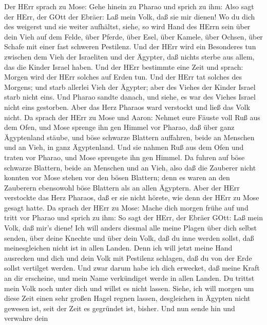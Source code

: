  Der HErr sprach zu Mose: Gehe hinein zu Pharao und sprich
zu ihm: Also sagt der HErr, der GOtt der Ebräer: Laß mein Volk, daß sie
mir dienen!  Wo du dich des weigerst und sie weiter
aufhältst,  siehe, so wird Hand des HErrn sein über dein
Vieh auf dem Felde, über Pferde, über Esel, über Kamele, über Ochsen,
über Schafe mit einer fast schweren Pestilenz.  Und der HErr
wird ein Besonderes tun zwischen dem Vieh der Israeliten und der
Ägypter, daß nichts sterbe aus allem, das die Kinder Israel haben.
 Und der HErr bestimmte eine Zeit und sprach: Morgen wird
der HErr solches auf Erden tun.  Und der HErr tat solches
des Morgens; und starb allerlei Vieh der Ägypter; aber des Viehes der
Kinder Israel starb nicht eins.  Und Pharao sandte danach,
und siehe, es war des Viehes Israel nicht eins gestorben. Aber das Herz
Pharaos ward verstockt und ließ das Volk nicht.  Da sprach
der HErr zu Mose und Aaron: Nehmet eure Fäuste voll Ruß aus dem Ofen,
und Mose sprenge ihn gen Himmel vor Pharao,  daß über ganz
Ägyptenland stäube, und böse schwarze Blattern auffahren, beide an
Menschen und an Vieh, in ganz Ägyptenland.  Und sie nahmen
Ruß aus dem Ofen und traten vor Pharao, und Mose sprengete ihn gen
Himmel. Da fuhren auf böse schwarze Blattern, beide an Menschen und an
Vieh,  also daß die Zauberer nicht konnten vor Mose stehen
vor den bösen Blattern; denn es waren an den Zauberern ebensowohl böse
Blattern als an allen Ägyptern.  Aber der HErr verstockte
das Herz Pharaos, daß er sie nicht hörete, wie denn der HErr zu Mose
gesagt hatte.  Da sprach der HErr zu Mose: Mache dich
morgen frühe auf und tritt vor Pharao und sprich zu ihm: So sagt der
HErr, der Ebräer GOtt: Laß mein Volk, daß mir's diene!  Ich
will anders diesmal alle meine Plagen über dich selbst senden, über
deine Knechte und über dein Volk, daß du inne werden sollst, daß
meinesgleichen nicht ist in allen Landen.  Denn ich will
jetzt meine Hand ausrecken und dich und dein Volk mit Pestilenz
schlagen, daß du von der Erde sollst vertilget werden.  Und
zwar darum habe ich dich erwecket, daß meine Kraft an dir erscheine, und
mein Name verkündiget werde in allen Landen.  Du trittst
mein Volk noch unter dich und willst es nicht lassen. 
Siehe, ich will morgen um diese Zeit einen sehr großen Hagel regnen
lassen, desgleichen in Ägypten nicht gewesen ist, seit der Zeit es
gegründet ist, bisher.  Und nun sende hin und verwahre dein
